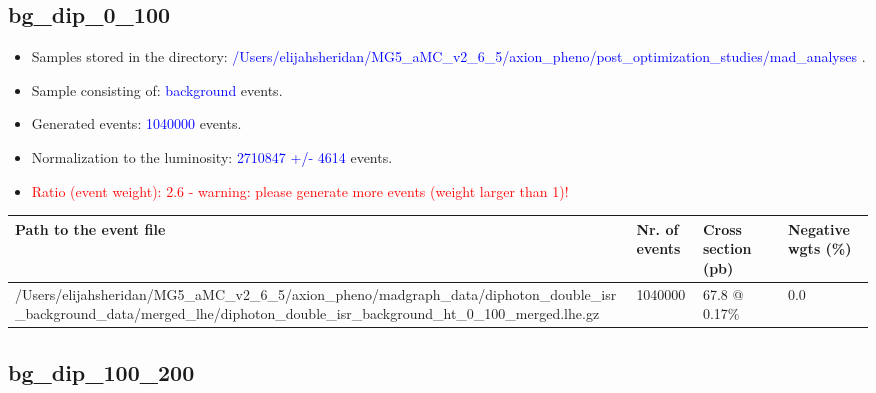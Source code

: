 \documentclass[a4paper, 10pt]{article}
\begin{document}
\subsection{ bg\_dip\_0\_100}

\begin{itemize}
  \item Samples stored in the directory: \textcolor{blue}{/\-Users/\-elijahsheridan/\-MG5\_aMC\_v2\_6\_5/\-axion\_pheno/\-post\_optimization\_studies/\-mad\_analyses} .
   \item Sample consisting of: \textcolor{blue}{background}  events.
   \item Generated events: \textcolor{blue}{1040000 }  events.
   \item Normalization to the luminosity: \textcolor{blue}{2710847}\textcolor{blue}{ +/\-- }\textcolor{blue}{4614 }  events.
   \item\textcolor{red}{Ratio (event weight): }\textcolor{red}{2.6 }\textcolor{red}{ - warning: please generate more events (weight larger than 1)!}
\textcolor{red}{}
\end{itemize}
\begin{table}[H]
  \begin{center}
    \begin{tabular}{|m{55.0mm}|m{25.0mm}|m{30.0mm}|m{30.0mm}|}
      \hline
      {\cellcolor{yellow}         Path to the event file}& {\cellcolor{yellow}         Nr. of events}& {\cellcolor{yellow}         Cross section (pb)}& {\cellcolor{yellow}         Negative wgts (\%)}\\
      \hline
      {\cellcolor{white}          /\-Users/\-elijahsheridan/\-MG5\_aMC\_v2\_6\_5/\-axion\_pheno/\-madgraph\_data/\-diphoton\_double\_isr\_background\_data/\-merged\_lhe/\-diphoton\_double\_isr\_background\_ht\_0\_100\_merged.lhe.gz}& {\cellcolor{white}          1040000}& {\cellcolor{white}          67.8 @ 0.17\%}& {\cellcolor{white}          0.0}\\
\hline
    \end{tabular}
  \end{center}
\end{table}

\subsection{ bg\_dip\_100\_200}
\end{document}
